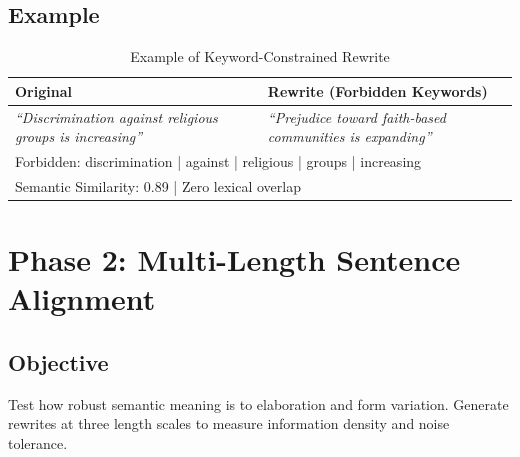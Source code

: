 \documentclass[12pt,a4paper]{report}
\begin{document}
\begin{center}
\end{center}

\section{Example}

\begin{table}[H]
\centering
\begin{tabular}{p{6cm}p{6cm}}
\toprule
\textbf{Original} & \textbf{Rewrite (Forbidden Keywords)}\\
\midrule
\textit{``Discrimination against religious groups is increasing''} & \textit{``Prejudice toward faith-based communities is expanding''} \\
\midrule
\multicolumn{2}{p{12cm}}{\small Forbidden: discrimination | against | religious | groups | increasing} \\
\multicolumn{2}{p{12cm}}{\small Semantic Similarity: 0.89 | Zero lexical overlap} \\
\bottomrule
\end{tabular}
\caption{Example of Keyword-Constrained Rewrite}
\end{table}

\newpage

\chapter{Phase 2: Multi-Length Sentence Alignment}

\section{Objective}

Test how robust semantic meaning is to elaboration and form variation. Generate rewrites at three length scales to measure information density and noise tolerance.
\end{document}
